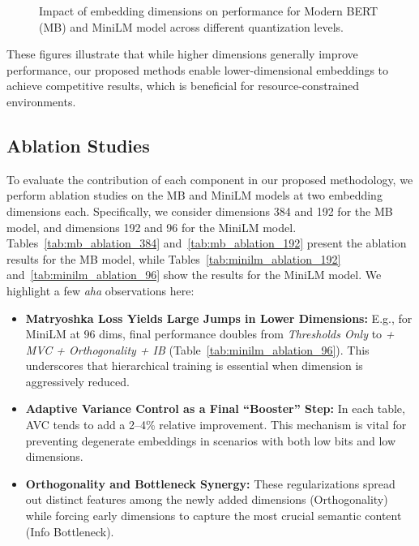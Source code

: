 \begin{figure}[ht]
    \centering
    \caption{Impact of embedding dimensions on performance for Modern BERT (MB) and MiniLM model across different quantization levels.}
    \label{fig:dimension_impact_mb}
\end{figure}


These figures illustrate that while higher dimensions generally improve performance, our proposed methods enable lower-dimensional embeddings to achieve competitive results, which is beneficial for resource-constrained environments.

\subsection{Ablation Studies}
\label{sec:ablation_summaries}

To evaluate the contribution of each component in our proposed methodology, we perform ablation studies on the MB and MiniLM models at two embedding dimensions each. 
Specifically, we consider dimensions 384 and 192 for the MB model, and dimensions 192 and 96 for the MiniLM model. 
Tables~\ref{tab:mb_ablation_384} and~\ref{tab:mb_ablation_192} present the ablation results for the MB model, while Tables~\ref{tab:minilm_ablation_192} and~\ref{tab:minilm_ablation_96} show the results for the MiniLM model.
We highlight a few \emph{aha} observations here:
\begin{itemize}
    \item \textbf{Matryoshka Loss Yields Large Jumps in Lower Dimensions:} E.g., for MiniLM at 96 dims, final performance doubles from \textit{Thresholds Only} to \textit{+ MVC + Orthogonality + IB} (Table~\ref{tab:minilm_ablation_96}). This underscores that hierarchical training is essential when dimension is aggressively reduced.
    \item \textbf{Adaptive Variance Control as a Final “Booster” Step:} In each table, AVC tends to add a 2--4\% relative improvement. This mechanism is vital for preventing degenerate embeddings in scenarios with both low bits and low dimensions.
    \item \textbf{Orthogonality and Bottleneck Synergy:} These regularizations spread out distinct features among the newly added dimensions (Orthogonality) while forcing early dimensions to capture the most crucial semantic content (Info Bottleneck).
\end{itemize}

